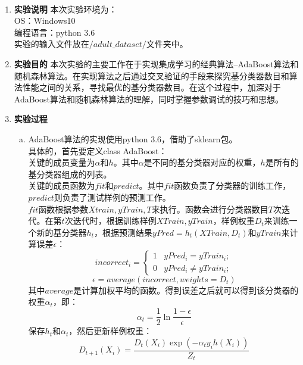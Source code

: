 \documentclass[a4paper,UTF8]{article}
\numberwithin{equation}{section}
\begin{document}
\\
\begin{enumerate}[1.]
\item\textbf{实验说明}
本次实验环境为：\\
OS：Windows10\\
编程语言：python 3.6\\
实验的输入文件放在$/adult\_dataset/$文件夹中。\\
\item\textbf{实验目的}
本次实验的主要工作在于实现集成学习的经典算法--AdaBoost算法和随机森林算法。在实现算法之后通过交叉验证的手段来探究基分类器数目和算法性能之间的关系，寻找最优的基分类器数目。在这个过程中，加深对于AdaBoost算法和随机森林算法的理解，同时掌握参数调试的技巧和思想。\\
\item\textbf{实验过程}
\begin{enumerate}[a.]
\item AdaBoost算法的实现使用python 3.6，借助了sklearn包。\\
具体的，首先要定义class AdaBoost：\\
关键的成员变量为$\alpha$和$h$。其中$\alpha$是不同的基分类器对应的权重，$h$是所有的基分类器组成的列表。\\
关键的成员函数为$fit$和$predict$。其中$fit$函数负责了分类器的训练工作，$predict$则负责了测试样例的预测工作。\\
$fit$函数根据参数$Xtrain, yTrain, T$来执行。函数会进行分类器数目$T$次迭代。在第$t$次迭代时，根据训练样例$XTrain,yTrain$，样例权重$D_t$来训练一个新的基分类器$h_t$，根据预测结果$yPred = h_t(XTrain, D_t)$和$yTrain$来计算误差$\epsilon$：
\begin{equation}
incorrect_i = 
\begin{cases}
1 & yPred_i = yTrain_i;\\
0 & yPred_i \neq yTrain_i;
\end{cases}
\end{equation}
\begin{equation}
\epsilon = average(incorrect, weights=D_t)
\end{equation}
其中$average$是计算加权平均的函数。得到误差之后就可以得到该分类器的权重$\alpha_t$，即：
\begin{equation}
\alpha_t = \frac{1}{2}\ln \frac{1-\epsilon}{\epsilon}
\end{equation}
保存$h_t$和$\alpha_t$，然后更新样例权重：
\begin{equation}
D_{t+1}(X_i) = \frac{D_t(X_i)\exp(-\alpha_ty_ih(X_i))}{Z_t}
\end{equation}

\end{enumerate}
\end{enumerate}
\end{document}
